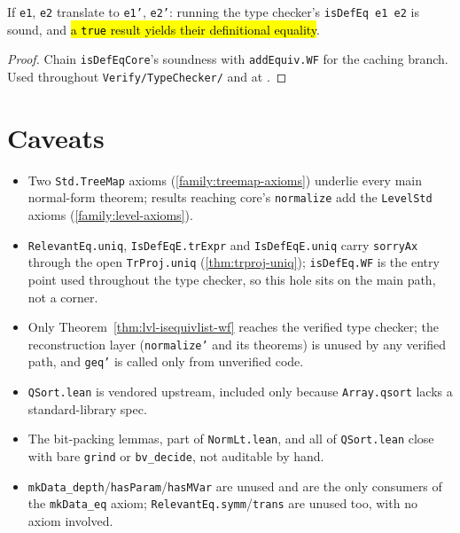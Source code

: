 \begin{theorem}
\label{thm:eqvmgr-isdefeq-wf}
\leanok
{}
 If \texttt{e1}, \texttt{e2} translate to \texttt{e1'}, \texttt{e2'}: running the type
checker's \texttt{isDefEq e1 e2} is sound, and \hl{a \texttt{true} result yields their definitional
equality}.
\end{theorem}
\begin{proof}
\leanok
{} Chain \texttt{isDefEqCore}'s soundness with \texttt{addEquiv.WF} for the caching
branch. Used throughout \texttt{Verify/TypeChecker/} and at
.
\end{proof}

\section*{Caveats}

\begin{itemize}
\item Two \texttt{Std.TreeMap} axioms (\ref{family:treemap-axioms}) underlie every main normal-form
theorem; results reaching core's \texttt{normalize} add the \texttt{LevelStd} axioms
(\ref{family:level-axioms}).
\item \texttt{RelevantEq.uniq}, \texttt{IsDefEqE.trExpr} and \texttt{IsDefEqE.uniq} carry
\texttt{sorryAx} through the open \texttt{TrProj.uniq} (\ref{thm:trproj-uniq}); \texttt{isDefEq.WF} is
the entry point used throughout the type checker, so this hole sits on the main path, not a corner.
\item Only Theorem~\ref{thm:lvl-isequivlist-wf} reaches the verified type checker; the reconstruction
layer (\texttt{normalize'} and its theorems) is unused by any verified path, and \texttt{geq'} is
called only from unverified code.
\item \texttt{QSort.lean} is vendored upstream, included only because \texttt{Array.qsort} lacks a
standard-library spec.
\item The bit-packing lemmas, part of \texttt{NormLt.lean}, and all of \texttt{QSort.lean} close with
bare \texttt{grind} or \texttt{bv\_decide}, not auditable by hand.
\item \texttt{mkData\_depth}/\texttt{hasParam}/\texttt{hasMVar} are unused and are the only consumers of
the \texttt{mkData\_eq} axiom; \texttt{RelevantEq.symm}/\texttt{trans} are unused too, with no axiom
involved.
\end{itemize}
